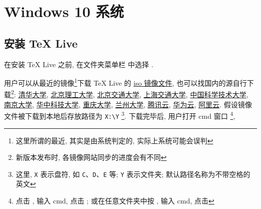 
\chapter{Windows 10 系统}

\section{安装 \TeX{} Live}\label{sec:windows:install}

在安装 \TeX{} Live 之前,
在文件夹菜单栏  中选择 .

用户可以从最近的镜像\footnote{这里所谓的最近, 其实是由系统判定的, 实际上系统可能会误判}下载 \TeX{} Live 的
\href{https://mirrors.ctan.org/systems/texlive/Images/texlive2020.iso}{iso 镜像文件},
也可以找国内的源自行下载\footnote{新版本发布时, 各镜像网站同步的进度会有不同}:
\href{https://mirrors.tuna.tsinghua.edu.cn/CTAN/systems/texlive/Images/texlive2020.iso}{清华大学},
\href{https://mirrors.bit.edu.cn/CTAN/systems/texlive/Images/texlive2020.iso}{北京理工大学},
\href{https://mirror.bjtu.edu.cn/ctan/systems/texlive/Images/texlive2020.iso}{北京交通大学},
\href{https://mirrors.sjtug.sjtu.edu.cn/ctan/systems/texlive/Images/texlive2020.iso}{上海交通大学},
\href{https://mirrors.ustc.edu.cn/CTAN/systems/texlive/Images/texlive2020.iso}{中国科学技术大学},
\href{https://mirrors.nju.edu.cn/CTAN/systems/texlive/Images/texlive2020.iso}{南京大学},
\href{http://mirrors.hust.edu.cn/CTAN/systems/texlive/Images/texlive2020.iso}{华中科技大学},
\href{https://mirrors.cqu.edu.cn/CTAN/systems/texlive/Images/texlive2020.iso}{重庆大学},
\href{https://mirror.lzu.edu.cn/CTAN/systems/texlive/Images/texlive2020.iso}{兰州大学},
\href{https://mirrors.cloud.tencent.com/CTAN/systems/texlive/Images/texlive2020.iso}{腾讯云},
\href{https://mirrors.huaweicloud.com/CTAN/systems/texlive/Images/texlive2020.iso}{华为云},
\href{https://mirrors.aliyun.com/CTAN/systems/texlive/Images/texlive2020.iso}{阿里云}.
假设镜像文件被下载到本地后存放路径为 \texttt{X:\textbackslash Y}%
\footnote{这里, \texttt{X} 表示盘符,
如 \texttt{C}、\texttt{D}、\texttt{E} 等;
\texttt{Y} 表示文件夹;
默认路径名称为不带空格的英文}.
下载完毕后, 用户打开 \textsf{cmd} 窗口%
\footnote{点击 \keys{\faWindows},
输入 \textsf{cmd},
点击 \keys{\enter};
或在任意文件夹中按 ,
输入 \textsf{cmd},
点击 \keys{\enter}},
